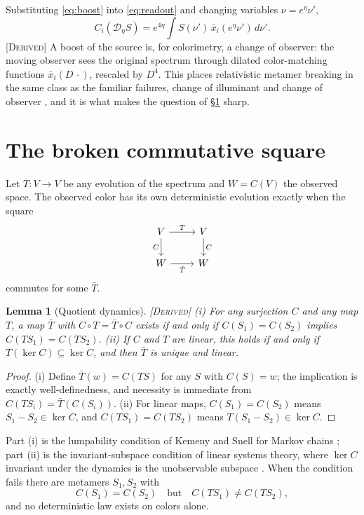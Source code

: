 \documentclass[11pt]{article}
\theoremstyle{boldplain}
\newtheorem{lemma}{Lemma}
\theoremstyle{boldupright}
\newcommand{\derived}{[\textup{\textsc{Derived}}]}
\newcommand{\Dop}{\mathcal{D}}
\begin{document}
Substituting \eqref{eq:boost} into \eqref{eq:readout} and changing variables $\nu=e^\eta\nu'$,
\begin{equation}\label{eq:dilated}
C_i(\Dop_\eta S)=e^{4\eta}\int S(\nu')\,\bar x_i(e^\eta\nu')\,d\nu'.
\end{equation}
\derived{} A boost of the source is, for colorimetry, a change of observer: the moving observer sees
the original spectrum through dilated color-matching functions $\bar x_i(D\,\cdot)$, rescaled by $D^4$. This places
relativistic metamer breaking in the same class as the familiar failures, change of illuminant and
change of observer \cite{wyszecki1982}, and it is what makes the question of \S\ref{sec:square} sharp.

\section{The broken commutative square}\label{sec:square}

Let $T:V\to V$ be any evolution of the spectrum and $W=C(V)$ the observed space. The observed
color has its own deterministic evolution exactly when the square
\[
\begin{tikzcd}
V \arrow[r,"T"] \arrow[d,"C"'] & V \arrow[d,"C"]\\
W \arrow[r,"\bar T"'] & W
\end{tikzcd}
\]
commutes for some $\bar T$.

\begin{lemma}[Quotient dynamics]\label{lem:quotient}
\derived{} (i) For any surjection $C$ and any map $T$, a map $\bar T$
with $C\circ T=\bar T\circ C$ exists if and only if $C(S_1)=C(S_2)$ implies $C(TS_1)=C(TS_2)$. (ii) If $C$ and $T$
are linear, this holds if and only if $T(\ker C)\subseteq\ker C$, and then $\bar T$ is unique and linear.
\end{lemma}

\begin{proof}
(i) Define $\bar T(w)=C(TS)$ for any $S$ with $C(S)=w$; the implication is exactly well-definedness,
and necessity is immediate from $C(TS_i)=\bar T(C(S_i))$. (ii) For linear maps, $C(S_1)=C(S_2)$ means
$S_1-S_2\in\ker C$, and $C(TS_1)=C(TS_2)$ means $T(S_1-S_2)\in\ker C$.
\end{proof}

Part (i) is the lumpability condition of Kemeny and Snell for Markov chains \cite{kemeny1960}; part (ii) is the
invariant-subspace condition of linear systems theory, where $\ker C$ invariant under the dynamics is
the unobservable subspace \cite{kalman1963,wonham1979}. When the condition fails there are metamers $S_1,S_2$ with
\begin{equation}\label{eq:broken}
C(S_1)=C(S_2)\quad\text{but}\quad C(TS_1)\neq C(TS_2),
\end{equation}
and no deterministic law exists on colors alone.
\end{document}
